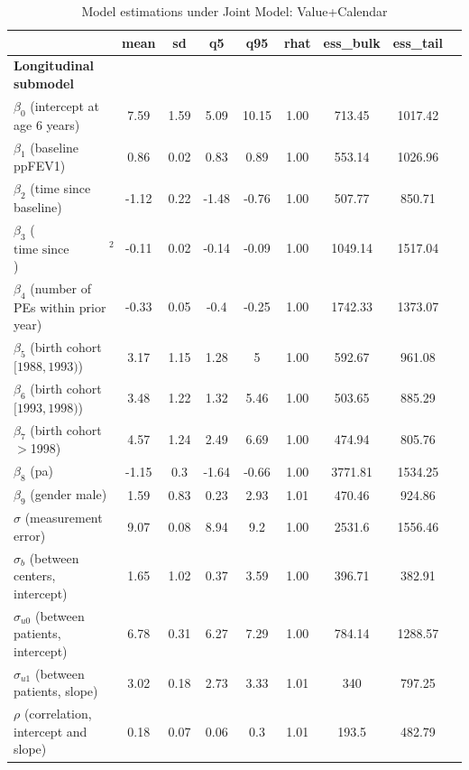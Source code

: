 \begin{table}[H]
  \small\sf\centering
  \captionsetup{justification=centering}
   \caption{Model estimations under Joint Model: Value+Calendar} \label{tab:chp3_est}
    \begin{threeparttable}
  \begin{tabular}{lcccccccc}
    \toprule
  & mean \tnote{1} & sd \tnote{2} & q5 \tnote{3} & q95 \tnote{3} & rhat \tnote{4} & ess\_bulk \tnote{5} & ess\_tail \tnote{6}\\
 \midrule
  \rowcolor{Gainsboro!60}
   \bf Longitudinal submodel &&&&&&& \\
    $\beta_0$ (intercept at age 6 years) & 7.59 & 1.59 & 5.09 &	10.15 &	1.00 & 713.45 & 1017.42 \\
    $\beta_1$ (baseline ppFEV1) & 0.86 & 0.02 &	0.83 & 0.89 & 1.00 &	553.14 & 1026.96\\
    $\beta_2$ (time since baseline) & -1.12	& 0.22 & -1.48 & -0.76 & 1.00 & 507.77 & 850.71\\
    $\beta_3$ ($\mbox{time since baseline}^2$) & -0.11 & 0.02 &	-0.14 &	-0.09 & 1.00 & 1049.14 & 1517.04\\
    $\beta_4$ (number of PEs within prior year) & -0.33 & 0.05 &	-0.4 & -0.25 & 1.00 & 1742.33 & 1373.07\\
    $\beta_5$ (birth cohort\tnote{$\ast$} $[1988, 1993)$) &3.17 &	1.15 & 1.28 & 5 & 1.00 &	592.67 & 961.08\\
    $\beta_6$ (birth cohort $[1993, 1998)$) & 3.48 & 1.22 &	1.32 & 5.46 & 1.00 & 503.65 &	885.29 \\
    $\beta_7$ (birth cohort $>$1998) & 4.57 & 1.24 & 2.49 &	6.69 & 1.00 &	474.94 & 805.76\\
    $\beta_8$ (pa) & -1.15 & 0.3 & -1.64 & -0.66 & 1.00 & 3771.81 &	1534.25\\
    $\beta_9$ (gender\tnote{$\ast$}  male)  & 1.59 &	0.83 & 0.23 & 2.93 & 1.01 &	470.46 & 924.86\\
    $\sigma$ (measurement error)& 9.07 & 0.08 & 8.94 & 9.2 & 1.00 & 2531.6 & 1556.46\\
    $\sigma_b$ (between centers, intercept) & 1.65 &	1.02 & 0.37 & 3.59 & 1.00 & 396.71 & 382.91\\
    $\sigma_{u0}$ (between patients, intercept) & 6.78 & 0.31 & 6.27 & 7.29 &	1.00 & 784.14 &	1288.57\\
    $\sigma_{u1}$ (between patients, slope)& 3.02 & 0.18 & 2.73 & 3.33 &	1.01 & 340 & 797.25\\
    $\rho$ (correlation, intercept and slope) & 0.18 &	0.07 & 0.06 & 0.3 &	1.01 & 193.5 & 482.79\\

\end{tabular}
\end{threeparttable}
\end{table}
